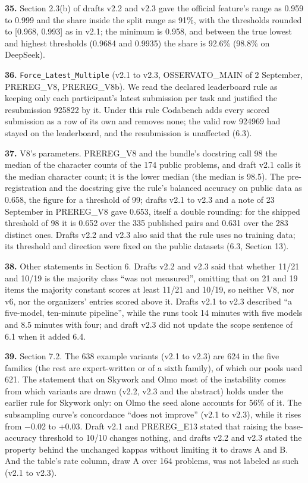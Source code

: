 \noindent\textbf{35.} Section 2.3(b) of drafts v2.2 and v2.3 gave the official feature's range as 0.959 to 0.999 and the share inside the split range as 91\%, with the thresholds rounded to [0.968, 0.993] as in v2.1; the minimum is 0.958, and between the true lowest and highest thresholds (0.9684 and 0.9935) the share is 92.6\% (98.8\% on DeepSeek).
\par

\noindent\textbf{36.} \texttt{Force\_Latest\_Multiple} (v2.1 to v2.3, OSSERVATO\_MAIN of 2 September, PREREG\_V8, PREREG\_V8b). We read the declared leaderboard rule as keeping only each participant's latest submission per task and justified the resubmission 925822 by it. Under this rule Codabench adds every scored submission as a row of its own and removes none; the valid row 924969 had stayed on the leaderboard, and the resubmission is unaffected (6.3).
\par

\noindent\textbf{37.} V8's parameters. PREREG\_V8 and the bundle's docstring call 98 the median of the character counts of the 174 public problems, and draft v2.1 calls it the median character count; it is the lower median (the median is 98.5). The pre-registration and the docstring give the rule's balanced accuracy on public data as 0.658, the figure for a threshold of 99; drafts v2.1 to v2.3 and a note of 23 September in PREREG\_V8 gave 0.653, itself a double rounding: for the shipped threshold of 98 it is 0.652 over the 335 published pairs and 0.631 over the 283 distinct ones. Drafts v2.2 and v2.3 also said that the rule uses no training data; its threshold and direction were fixed on the public datasets (6.3, Section 13).
\par

\noindent\textbf{38.} Other statements in Section 6. Drafts v2.2 and v2.3 said that whether 11/21 and 10/19 is the majority class ``was not measured'', omitting that on 21 and 19 items the majority constant scores at least 11/21 and 10/19, so neither V8, nor v6, nor the organizers' entries scored above it. Drafts v2.1 to v2.3 described ``a five-model, ten-minute pipeline'', while the runs took 14 minutes with five models and 8.5 minutes with four; and draft v2.3 did not update the scope sentence of 6.1 when it added 6.4.
\par

\noindent\textbf{39.} Section 7.2. The 638 example variants (v2.1 to v2.3) are 624 in the five families (the rest are expert-written or of a sixth family), of which our pools used 621. The statement that on Skywork and Olmo most of the instability comes from which variants are drawn (v2.2, v2.3 and the abstract) holds under the earlier rule for Skywork only: on Olmo the seed alone accounts for 56\% of it. The subsampling curve's concordance ``does not improve'' (v2.1 to v2.3), while it rises from $-$0.02 to +0.03. Draft v2.1 and PREREG\_E13 stated that raising the base-accuracy threshold to 10/10 changes nothing, and drafts v2.2 and v2.3 stated the property behind the unchanged kappas without limiting it to draws A and B. And the table's rate column, draw A over 164 problems, was not labeled as such (v2.1 to v2.3).
\par

